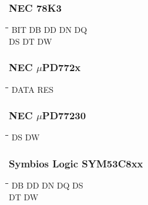 \subsubsection{NEC 78K3}
{\tt\begin{tabbing}
\hspace{3cm}\=\hspace{3cm}\=\hspace{3cm}\=\hspace{3cm}\=\kill
BIT        \> DB         \> DD          \> DN          \> DQ \\
DS         \> DT         \> DW \\
\end{tabbing}}

\subsubsection{NEC $\mu$PD772x}
{\tt\begin{tabbing}
\hspace{3cm}\=\hspace{3cm}\=\hspace{3cm}\=\hspace{3cm}\=\kill
DATA       \> RES \\
\end{tabbing}}

\subsubsection{NEC $\mu$PD77230}
{\tt\begin{tabbing} 
\hspace{3cm}\=\hspace{3cm}\=\hspace{3cm}\=\hspace{3cm}\=\kill
DS         \> DW \\
\end{tabbing}}

\subsubsection{Symbios Logic SYM53C8xx}
{\tt\begin{tabbing} 
\hspace{3cm}\=\hspace{3cm}\=\hspace{3cm}\=\hspace{3cm}\=\kill
DB         \> DD          \> DN          \> DQ          \> DS \\
DT         \> DW \\
\end{tabbing}}

